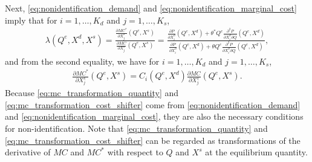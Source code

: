 \documentclass[11pt, a4paper]{article}
\theoremstyle{remark}
\begin{document}



Next, \eqref{eq:nonidentification_demand} and \eqref{eq:nonidentification_marginal_cost} imply that for $i = 1, \ldots, K_d$ and $j = 1, \ldots, K_s$,
\begin{align}
    \lambda(Q^e, X^{d}, X^{s}) =  \frac{\frac{\partial MC^{*}}{\partial X^{s}_j}(Q^e, X^{s})}{\frac{\partial MC}{\partial X^{s}_j}(Q^e, X^{s})} =  \frac{\frac{\partial P}{\partial X^{d}_i}(Q^e, X^{d}) + \theta^{*} Q^e\frac{\partial^2 P}{\partial X^{d}_{i}\partial Q}(Q^e, X^{d}) }{\frac{\partial P}{\partial X^{d}_i}(Q^e, X^{d}) + \theta Q^e\frac{\partial^2 P}{\partial X^{d}_{i}\partial Q}(Q^e, X^{d})},
\end{align}
and from the second equality, we have for $i = 1, \ldots, K_d$ and $j = 1, \ldots, K_s$,
\begin{align}
    \frac{\partial MC^{*}}{\partial X^{s}_j}(Q^e, X^{s}) = C_i(Q^e, X^{d})\frac{\partial MC}{\partial X^{s}_j}(Q^e, X^{s}).\label{eq:mc_transformation_cost_shifter}
\end{align}
Because \eqref{eq:mc_transformation_quantity} and \eqref{eq:mc_transformation_cost_shifter} come from \eqref{eq:nonidentification_demand} and \eqref{eq:nonidentification_marginal_cost}, they are also the necessary conditions for non-identification.
Note that \eqref{eq:mc_transformation_quantity} and \eqref{eq:mc_transformation_cost_shifter} can be regarded as transformations of the derivative of $MC$ and $MC^{*}$ with respect to $Q$ and $X^{s}$ at the equilibrium quantity.
\end{document}
